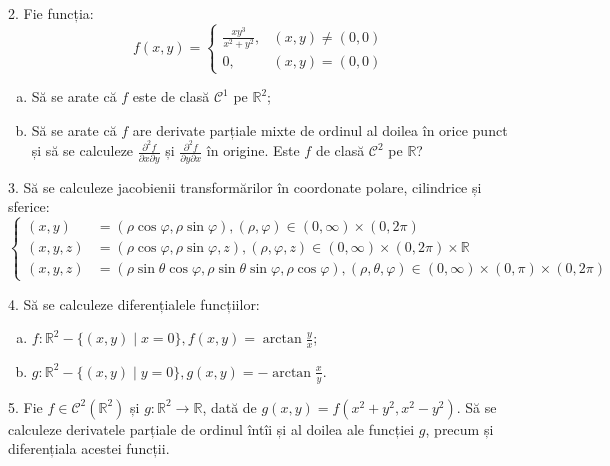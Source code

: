 \documentclass[11pt,a4paper]{article}
\newcommand\kal{\mathcal}
\newcommand\RR{\mathbb{R}}
\theoremstyle{dotless}
\theoremstyle{dotlessdr}
\begin{document}
\vspace{1cm}

2. Fie funcția:
\[
  f(x, y) = \begin{cases}
    \frac{xy^3}{x^2 + y^2}, & (x, y) \neq (0, 0) \\
    0, & (x, y) = (0, 0)
  \end{cases}
\]

\begin{enumerate}[(a)]
\item Să se arate că $f$ este de clasă $\kal{C}^1$ pe $\RR^2$;
\item Să se arate că $f$ are derivate parțiale mixte de ordinul al doilea în orice punct
  și să se calculeze $\frac{\partial^2 f}{\partial x \partial y}$ și $\frac{\partial^2 f}{\partial y \partial x}$
  în origine. Este $f$ de clasă $\kal{C}^2$ pe $\RR$?
\end{enumerate}

\vspace{1cm}

3. Să se calculeze jacobienii transformărilor în coordonate polare,
cilindrice și sferice:
\[
  \begin{cases}
    (x, y) &= (\rho \cos \varphi, \rho \sin \varphi), (\rho, \varphi) \in (0, \infty) \times (0, 2\pi) \\
    (x, y, z) &= (\rho \cos \varphi, \rho \sin \varphi, z), (\rho, \varphi, z) \in (0, \infty) \times (0, 2\pi) \times \RR \\
    (x, y, z) &= (\rho \sin \theta \cos \varphi, \rho \sin \theta \sin \varphi, \rho \cos \varphi), %
    (\rho, \theta, \varphi) \in (0, \infty) \times (0, \pi) \times (0, 2\pi)
  \end{cases}
\]

\vspace{1cm}

4. Să se calculeze diferențialele funcțiilor:
\begin{enumerate}[(a)]
\item $f : \RR^2 - \{ (x, y) \mid x = 0 \}, f(x, y) = \arctan \frac{y}{x}$;
\item $g : \RR^2 - \{ (x, y) \mid y = 0 \}, g(x, y) = -\arctan \frac{x}{y}$.
\end{enumerate}

\vspace{1cm}

5. Fie $f \in \kal{C}^2(\RR^2)$ și $g : \RR^2 \to \RR$, dată de $g(x, y) = f(x^2 + y^2, x^2 - y^2)$.
Să se calculeze derivatele parțiale de ordinul întîi și al doilea ale funcției $g$, precum și
diferențiala acestei funcții.
\end{document}
